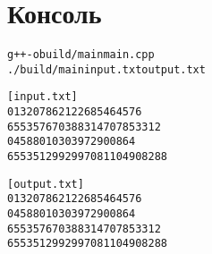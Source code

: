 \pagebreak

\section{Консоль}
\begin{alltt}
g++ -o build/main main.cpp
./build/main input.txt output.txt

[input.txt]
0	13207862122685464576
65535	7670388314707853312
0	4588010303972900864
65535	12992997081104908288

[output.txt]
0	13207862122685464576
0	4588010303972900864
65535	7670388314707853312
65535	12992997081104908288
\end{alltt}
\pagebreak

